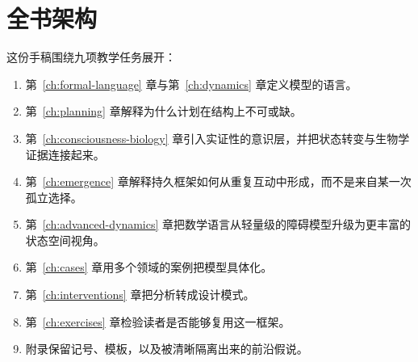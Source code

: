 \section{全书架构}

这份手稿围绕九项教学任务展开：
\begin{enumerate}[nosep]
  \item 第~\ref{ch:formal-language} 章与第~\ref{ch:dynamics} 章定义模型的语言。
  \item 第~\ref{ch:planning} 章解释为什么计划在结构上不可或缺。
  \item 第~\ref{ch:consciousness-biology} 章引入实证性的意识层，并把状态转变与生物学证据连接起来。
  \item 第~\ref{ch:emergence} 章解释持久框架如何从重复互动中形成，而不是来自某一次孤立选择。
  \item 第~\ref{ch:advanced-dynamics} 章把数学语言从轻量级的障碍模型升级为更丰富的状态空间视角。
  \item 第~\ref{ch:cases} 章用多个领域的案例把模型具体化。
  \item 第~\ref{ch:interventions} 章把分析转成设计模式。
  \item 第~\ref{ch:exercises} 章检验读者是否能够复用这一框架。
  \item 附录保留记号、模板，以及被清晰隔离出来的前沿假说。
\end{enumerate}